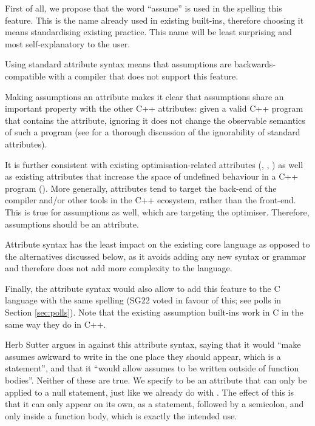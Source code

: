 First of all, we propose that the word ``assume'' is used in the spelling this feature. This is the name already used in existing built-ins, therefore choosing it means standardising existing practice. This name will be least surprising and most self-explanatory to the user.

Using standard attribute syntax means that assumptions are backwards-compatible with a compiler that does not support this feature. 

Making assumptions an attribute makes it clear that assumptions share an important property with the other C++ attributes: given a valid C++ program that contains the attribute, ignoring it does not change the observable semantics of such a program (see \cite{P2552R0} for a thorough discussion of the ignorability of standard attributes).

It is further consistent with existing optimisation-related attributes (\tcode{[[likely]]}, \tcode{[[unlikely]]}, ) as well as existing attributes that increase the space of undefined behaviour in a C++ program (\tcode{[[noreturn]]}). More generally, attributes tend to target the back-end of the compiler and/or other tools in the C++ ecosystem, rather than the front-end. This is true for assumptions as well, which are targeting the optimiser. Therefore, assumptions should be an attribute.

Attribute syntax has the least impact on the existing core language as opposed to the alternatives discussed below, as it avoids adding any new syntax or grammar and therefore does not add more complexity to the language.

Finally, the attribute syntax would also allow to add this feature to the C language with the same spelling (SG22 voted in favour of this; see polls in Section \ref{sec:polls}). Note that the existing assumption built-ins work in C in the same way they do in C++.

Herb Sutter argues in \cite{P2064R0} against this attribute syntax, saying that it would ``make assumes awkward to write in the one place they should appear, which is a statement'', and that it ``would allow assumes to be written outside of function bodies''. Neither of these are true. We specify  to be an attribute that can only be applied to a null statement, just like we already do with \tcode{[[fallthrough]]}. The effect of this is that it can only appear on its own, as a statement, followed by a semicolon, and only inside a function body, which is exactly the intended use.

